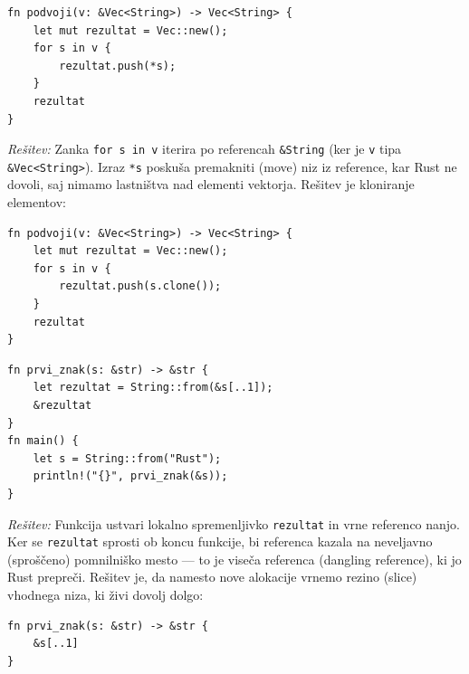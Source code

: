 \documentclass[arhiv]{../izpit}
\begin{document}
\podnaloga
\begin{verbatim}
fn podvoji(v: &Vec<String>) -> Vec<String> {
    let mut rezultat = Vec::new();
    for s in v {
        rezultat.push(*s);
    }
    rezultat
}
\end{verbatim}

\noindent
\emph{Rešitev:} Zanka \texttt{for s in v} iterira po referencah \texttt{&String} (ker je \texttt{v} tipa \texttt{&Vec<String>}). Izraz \texttt{*s} poskuša premakniti (move) niz iz reference, kar Rust ne dovoli, saj nimamo lastništva nad elementi vektorja. Rešitev je kloniranje elementov:
\begin{verbatim}
fn podvoji(v: &Vec<String>) -> Vec<String> {
    let mut rezultat = Vec::new();
    for s in v {
        rezultat.push(s.clone());
    }
    rezultat
}
\end{verbatim}

\podnaloga
\begin{verbatim}
fn prvi_znak(s: &str) -> &str {
    let rezultat = String::from(&s[..1]);
    &rezultat
}
fn main() {
    let s = String::from("Rust");
    println!("{}", prvi_znak(&s));
}
\end{verbatim}

\noindent
\emph{Rešitev:} Funkcija ustvari lokalno spremenljivko \texttt{rezultat} in vrne referenco nanjo. Ker se \texttt{rezultat} sprosti ob koncu funkcije, bi referenca kazala na neveljavno (sproščeno) pomnilniško mesto — to je viseča referenca (dangling reference), ki jo Rust prepreči. Rešitev je, da namesto nove alokacije vrnemo rezino (slice) vhodnega niza, ki živi dovolj dolgo:
\begin{verbatim}
fn prvi_znak(s: &str) -> &str {
    &s[..1]
}
\end{verbatim}
\end{document}
